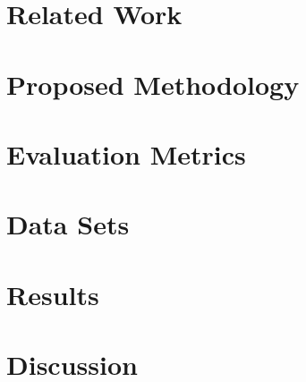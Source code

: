 \documentclass[12pt]{article}\usepackage[]{graphicx}\usepackage[]{color}
\begin{document}
\clearpage
\newpage
\section{Related Work}

\section{Proposed Methodology}

\section{Evaluation Metrics}

\section{Data Sets}

\section{Results}

\section{Discussion}

\clearpage
\newpage



\clearpage
\newpage
\end{document}
